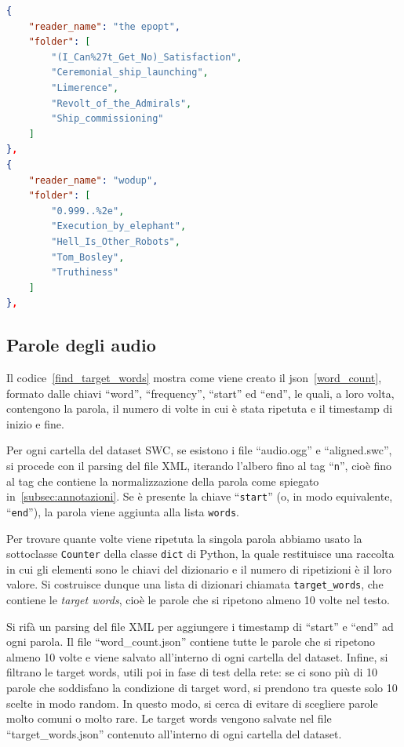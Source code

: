 \documentclass[12pt,a4paper,titlepage]{article}
\begin{document}
\begin{lstlisting}[language=json,firstnumber=1, caption=Formato del file readers\_paths.json, label=JSON_lettori,captionpos=b]
{
	"reader_name": "the epopt",
	"folder": [
		"(I_Can%27t_Get_No)_Satisfaction",
		"Ceremonial_ship_launching",
		"Limerence",
		"Revolt_of_the_Admirals",
		"Ship_commissioning"
	]
},
{
	"reader_name": "wodup",
	"folder": [
		"0.999..%2e",
		"Execution_by_elephant",
		"Hell_Is_Other_Robots",
		"Tom_Bosley",
		"Truthiness"
	]
},
\end{lstlisting}

\subsection{Parole degli audio}
\label{subsec:parole}
Il codice~\ref{find_target_words} mostra come viene creato il json~\ref{word_count}, formato dalle chiavi ``word'', ``frequency'', ``start'' ed ``end'', le quali, a loro volta, contengono la parola, il numero di volte in cui è stata ripetuta e il timestamp di inizio e fine.

Per ogni cartella del dataset SWC, se esistono i file ``audio.ogg'' e ``aligned.swc'', si procede con il parsing del file XML, iterando l'albero fino al tag  ``\texttt{n}'', cioè fino al tag che contiene la normalizzazione della parola come spiegato in~\ref{subsec:annotazioni}. Se è presente la chiave ``\texttt{start}'' (o, in modo equivalente, ``\texttt{end}''), la parola viene aggiunta alla lista \texttt{words}.

Per trovare quante volte viene ripetuta la singola parola abbiamo usato la sottoclasse \texttt{Counter} della classe \texttt{dict} di Python, la quale restituisce una raccolta in cui gli elementi sono le chiavi del dizionario e il numero di ripetizioni è il loro valore. Si costruisce dunque una lista di dizionari chiamata \texttt{target\_words}, che contiene le \emph{target words}, cioè le parole che si ripetono almeno 10 volte nel testo.~\cite{salamon:Few-Shot}

Si rifà un parsing del file XML per aggiungere i timestamp di ``start'' e ``end'' ad ogni parola. Il file ``word\_count.json'' contiene tutte le parole che si ripetono almeno 10 volte e viene salvato all'interno di ogni cartella del dataset. Infine, si filtrano le target words, utili poi in fase di test della rete: se ci sono più di 10 parole che soddisfano la condizione di target word, si prendono tra queste solo 10 scelte in modo random. In questo modo, si cerca di evitare di scegliere parole molto comuni o molto rare. Le target words vengono salvate nel file ``target\_words.json'' contenuto all'interno di ogni cartella del dataset. 
\end{document}
